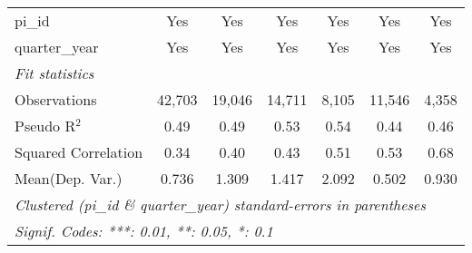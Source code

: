 \begin{tabular}{lcccccc}
   pi\_id                                                     & Yes           & Yes           & Yes            & Yes           & Yes         & Yes\\  
   quarter\_year                                              & Yes           & Yes           & Yes            & Yes           & Yes         & Yes\\  
   \midrule
   \emph{Fit statistics}\\
   Observations                                               & 42,703        & 19,046        & 14,711         & 8,105         & 11,546      & 4,358\\  
   Pseudo R$^2$                                               & 0.49          & 0.49          & 0.53           & 0.54          & 0.44        & 0.46\\  
   Squared Correlation                                        & 0.34          & 0.40          & 0.43           & 0.51          & 0.53        & 0.68\\  
Mean(Dep. Var.) & 0.736 & 1.309 & 1.417 & 2.092 & 0.502 & 0.930 \\
   \midrule \midrule
   \multicolumn{7}{l}{\emph{Clustered (pi\_id \& quarter\_year) standard-errors in parentheses}}\\
   \multicolumn{7}{l}{\emph{Signif. Codes: ***: 0.01, **: 0.05, *: 0.1}}\\
\end{tabular}
\par\endgroup
